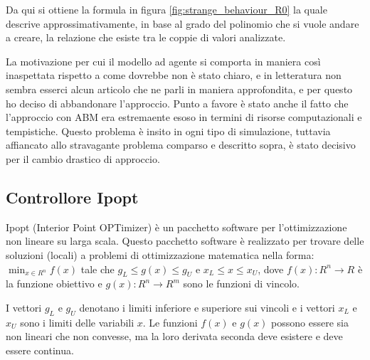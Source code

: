 Da qui si ottiene la formula in figura \ref{fig:strange_behaviour_R0} la quale descrive approssimativamente, 
in base al grado del polinomio che si vuole andare a creare, la relazione che esiste tra le coppie 
di valori analizzate.

La motivazione per cui il modello ad agente si comporta in maniera così inaspettata
rispetto a come dovrebbe non è stato chiaro, e in letteratura non sembra esserci alcun 
articolo che ne parli in maniera approfondita, e per questo ho deciso di abbandonare l'approccio.
Punto a favore è stato anche il fatto che l'approccio con ABM era estremaente esoso in termini 
di risorse computazionali e tempistiche. Questo problema è insito in ogni tipo di simulazione, 
tuttavia affiancato allo stravagante problema comparso e descritto sopra, è stato 
decisivo per il cambio drastico di approccio. 
\newpage

\subsection{Controllore Ipopt}
Ipopt (Interior Point OPTimizer) \cite{Wächter2006} è un pacchetto software per 
l'ottimizzazione non lineare su larga scala. Questo pacchetto software è realizzato 
per trovare delle soluzioni (locali) a problemi di ottimizzazione matematica nella forma:
$\min_{x \in R^n} f(x)$ tale che $g_L \leq g(x) \leq g_U$ e $x_L \leq x \leq x_U$, dove 
$f(x): R^n \rightarrow R$ è la funzione obiettivo e $g(x): R^n \rightarrow R^m$ 
sono le funzioni di vincolo.

I vettori $g_L$ e $g_U$ denotano i limiti inferiore e superiore sui vincoli e i vettori
$x_L$ e $x_U$ sono i limiti delle variabili $x$. Le funzioni $f(x)$ e $g(x)$ possono essere 
sia non lineari che non convesse, ma la loro derivata seconda deve esistere e deve essere 
continua.

